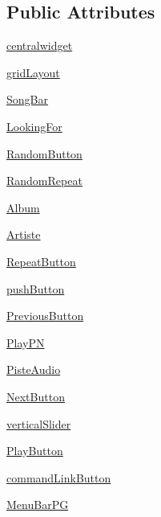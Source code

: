 \subsection*{Public Attributes}
\begin{DoxyCompactItemize}
\item 
\hyperlink{classpl_1_1Ui__ProjetGherkin_a481d496061636c88842ff77ed7082f45}{centralwidget}
\item 
\hyperlink{classpl_1_1Ui__ProjetGherkin_ace7f06269d7deb2c4d9a3c2a7fda382a}{gridLayout}
\item 
\hyperlink{classpl_1_1Ui__ProjetGherkin_a7364228c32c491d198ed510337362c55}{SongBar}
\item 
\hyperlink{classpl_1_1Ui__ProjetGherkin_a45b3f9ac6d5614e82459f4c69a12e7cf}{LookingFor}
\item 
\hyperlink{classpl_1_1Ui__ProjetGherkin_a52dc5bc0d0d3c8fc1aa70c7760c014a4}{RandomButton}
\item 
\hyperlink{classpl_1_1Ui__ProjetGherkin_ac26fdbf2c91437951ed14befde93f483}{RandomRepeat}
\item 
\hyperlink{classpl_1_1Ui__ProjetGherkin_a658130614e7665b889569566f38f7f87}{Album}
\item 
\hyperlink{classpl_1_1Ui__ProjetGherkin_a135ed8c9fd48470acabbd75be6bd7e2d}{Artiste}
\item 
\hyperlink{classpl_1_1Ui__ProjetGherkin_a4b3912319ccb97006dfb9d6482251763}{RepeatButton}
\item 
\hyperlink{classpl_1_1Ui__ProjetGherkin_a5d2cae0792a5932428ec276cbb70ed61}{pushButton}
\item 
\hyperlink{classpl_1_1Ui__ProjetGherkin_a25486239211df0be2184c132a6405d06}{PreviousButton}
\item 
\hyperlink{classpl_1_1Ui__ProjetGherkin_a7d0a6d20a2cd6c27d8484c7d9ec019a1}{PlayPN}
\item 
\hyperlink{classpl_1_1Ui__ProjetGherkin_ad1be1a2c892b9f2dba6fe9b830bf827d}{PisteAudio}
\item 
\hyperlink{classpl_1_1Ui__ProjetGherkin_a0ba061618d27b40d876cb5dd2b598628}{NextButton}
\item 
\hyperlink{classpl_1_1Ui__ProjetGherkin_ad8cfc0d7ba174a169670657728b7bddf}{verticalSlider}
\item 
\hyperlink{classpl_1_1Ui__ProjetGherkin_a8a641c3324efe98ff53c9ac59286f167}{PlayButton}
\item 
\hyperlink{classpl_1_1Ui__ProjetGherkin_a54027dec271a9425228cb625ec9828a6}{commandLinkButton}
\item 
\hyperlink{classpl_1_1Ui__ProjetGherkin_ab64c4a50f448ccb1b906be520e39e18e}{MenuBarPG}

\end{DoxyCompactItemize}
